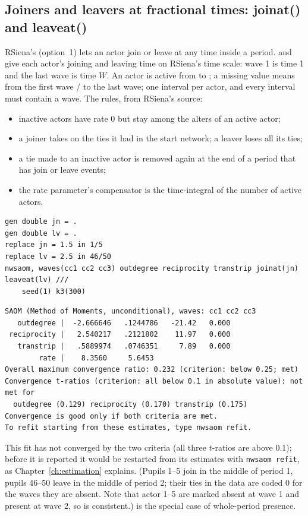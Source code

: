 \subsection{Joiners and leavers at fractional times: joinat() and leaveat()}

RSiena's  (option~1) lets an actor join or leave at any time inside a period.  and  give each actor's joining and leaving time on RSiena's time scale: wave 1 is time 1 and the last wave is time $W$. An actor is active from  to ; a missing value means from the first wave / to the last wave; one interval per actor, and every interval must contain a wave. The rules, from RSiena's source:
\begin{itemize}[nosep]
\item inactive actors have rate 0 but stay among the alters of an active actor;
\item a joiner takes on the ties it had in the start network; a leaver loses all its ties;
\item a tie made to an inactive actor is removed again at the end of a period that has join or leave events;
\item the rate parameter's compensator is the time-integral of the number of active actors.
\end{itemize}

\begin{lstlisting}
gen double jn = .
gen double lv = .
replace jn = 1.5 in 1/5
replace lv = 2.5 in 46/50
nwsaom, waves(cc1 cc2 cc3) outdegree reciprocity transtrip joinat(jn) leaveat(lv) ///
    seed(1) k3(300)
\end{lstlisting}
\begin{lstlisting}
SAOM (Method of Moments, unconditional), waves: cc1 cc2 cc3
   outdegree |  -2.666646   .1244786   -21.42   0.000
 reciprocity |   2.540217   .2121802    11.97   0.000
   transtrip |   .5889974   .0746351     7.89   0.000
        rate |    8.3560     5.6453
Overall maximum convergence ratio: 0.232 (criterion: below 0.25; met)
Convergence t-ratios (criterion: all below 0.1 in absolute value): not met for
  outdegree (0.129) reciprocity (0.170) transtrip (0.175)
Convergence is good only if both criteria are met.
To refit starting from these estimates, type nwsaom refit.
\end{lstlisting}
This fit has not converged by the two criteria (all three $t$-ratios are above 0.1); before it is reported it would be restarted from its estimates with \texttt{nwsaom refit}, as Chapter~\ref{ch:estimation} explains. (Pupils 1--5 join in the middle of period 1, pupils 46--50 leave in the middle of period 2; their ties in the data are coded 0 for the waves they are absent. Note that actor 1--5 are marked absent at wave 1 and present at wave 2, so  is consistent.)  is the special case of whole-period presence.

